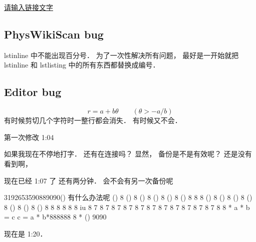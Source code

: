 

\href{http://www.example.com}{请输入链接文字}

\subsection{PhysWikiScan bug}
lstinline 中不能出现百分号． 为了一次性解决所有问题， 最好是一开始就把 lstinline 和 lstlisting 中的所有东西都替换成编号．

\subsection{Editor bug}
\begin{equation}
r = a + b\theta \qquad (\theta > -a/b)
\end{equation}
有时候剪切几个字符时一整行都会消失． 有时候又不会．

第一次修改 1:04

如果我现在不停地打字． 还有在连接吗？ 显然， 备份是不是有效呢？
还是没有看到啊， 

现在已经 1:07 了
还有两分钟． 会不会有另一次备份呢

3192653590889090() 有什么办法呢 () 8 () 8 () 8 () 8 () 8 () 8 8 8 () 8 () 8 () 8 () 8 () 8 () 8 () 8 8 8 8 8 8 iu 8 7 8 7 8 7 8 7 8 7 8 7 8 7 8 7 8 7 8 7 8 7 8 8 * a * b = c c = a * b*888888    8 * () 9090

现在是 1:20． 
